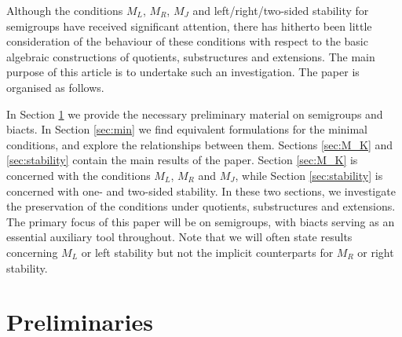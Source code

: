 \documentclass[twoside,a4paper,12pt,reqno]{amsart}
\theoremstyle{plain}
\theoremstyle{definition}
\renewcommand{\l}{\mbox{${\mathcal{L}}$}}
\renewcommand{\r}{\mbox{${\mathcal{R}}$}}
\newcommand{\h}{\mbox{${\mathcal{H}}$}}
\renewcommand{\j}{\mbox{${\mathcal{J}}$}}
\renewcommand{\k}{\mbox{${\mathcal{K}}$}}
\newcommand{\leqk}{\leq_{\mathcal{K}}}
\newcommand{\lk}{<_{\mathcal{K}}}
\newcommand{\N}{\mathbb{N}}
\begin{document}
Although the conditions $M_L$, $M_R$, $M_J$ and left/right/two-sided stability for semigroups have received significant attention, there has hitherto been little consideration of the behaviour of these conditions with respect to the basic algebraic constructions of quotients, substructures and extensions.  The main purpose of this article is to undertake such an investigation.  The paper is organised as follows.

In Section \ref{sec:prelim} we provide the necessary preliminary material on semigroups and biacts.  In Section \ref{sec:min} we find equivalent formulations for the minimal conditions, and explore the relationships between them.  Sections \ref{sec:M_K} and \ref{sec:stability} contain the main results of the paper.  Section \ref{sec:M_K} is concerned with the conditions $M_L$, $M_R$ and $M_J$, while Section \ref{sec:stability} is concerned with one- and two-sided stability.  In these two sections, we investigate the preservation of the conditions under quotients, substructures and extensions.  The primary focus of this paper will be on semigroups, with biacts serving as an essential auxiliary tool throughout.  Note that we will often state results concerning $M_L$ or left stability but not the implicit counterparts for $M_R$ or right stability.

\section{Preliminaries}\label{sec:prelim}

%

\end{document}
